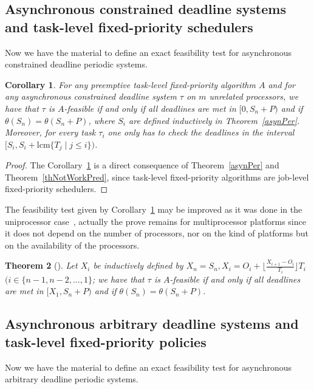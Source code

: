 \documentclass[a4paper,11pt]{article}
\newtheorem{Theorem}{Theorem}
\newtheorem{Corollary}[Theorem]{Corollary}
\newcommand{\lcm}{\mathrm{lcm}}
\begin{document}
\subsection{Asynchronous constrained deadline systems and task-level fixed-priority schedulers}

Now we have the material to define an exact feasibility test for
asynchronous constrained deadline periodic systems.



\begin{Corollary}\label{help} 
For any preemptive task-level fixed-priority algorithm $A$ and for any asynchronous constrained deadline system $\tau$ on $m$ unrelated processors, we have that $\tau$ is $A$-feasible if and only if all deadlines are met in $[0, S_n+P)$ and if $\theta(S_{n})=\theta(S_{n}+P)$, where $S_i$ are defined inductively in Theorem~\ref{asynPer}. Moreover, for every task $\tau_i$ one only has to check the deadlines in the interval $[S_i, S_i+ \lcm \{T_j \mid j \leq i\})$.
\end{Corollary}

\begin{proof}
The Corollary~\ref{help} is a direct consequence of Theorem~\ref{asynPer} and Theorem~\ref{thNotWorkPred}, since task-level fixed-priority algorithms are job-level fixed-priority schedulers.
\end{proof}

The feasibility test given by Corollary~\ref{help} may be improved
as it was done in the uniprocessor case~\cite{Goossens2}, actually the prove remains for multiprocessor platforms since it  does not depend on the number of processors, nor on the kind of platforms but on the availability of the processors.

\begin{Theorem}[\cite{Goossens2}]\label{thLowBoundInt} Let $X_i$ be
  inductively defined by $X_n=S_n, X_i=O_i + \lfloor
  \frac{X_{i+1}-O_i}{T_i} \rfloor T_i$ $(i \in \{n-1, n-2, \ldots, 1
  \}$; we have that $\tau$ is $A$-feasible if and only if all deadlines are met in $[X_{1}, S_n+P)$ and if $\theta(S_{n})=\theta(S_{n}+P)$.
  \end{Theorem}

\subsection{Asynchronous arbitrary deadline systems and task-level fixed-priority policies}

Now we have the material to define an exact feasibility test for
asynchronous arbitrary deadline periodic systems.
\end{document}
